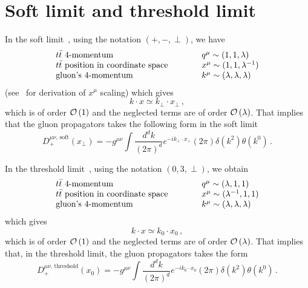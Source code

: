 \documentclass[a4paper,11pt]{report}
\numberwithin{equation}{section}
\begin{document}
\section{Soft limit and threshold limit}

In the soft limit~\cite{AntoniaMTh}, using the notation $(+,-,\perp)$, we have
%
\begin{equation}
  \begin{array}{lp{20pt}l}
  \text{\ttbar 4-momentum}                   & & q^\mu \sim (1,1,\lambda) \\
  \text{\ttbar position in coordinate space} & & 
      x^\mu \sim (1,1,\lambda^{-1}) \\
  \text{gluon's 4-momentum}                   & & 
      k^\mu \sim (\lambda,\lambda,\lambda) \\
  \end{array}
\end{equation}
%
(see~\cite{Becher:2010tm} for derivation of $x^\mu$ scaling) which gives
%
\begin{equation}
  k \cdot x \simeq k_\perp \cdot x_\perp\,,
\end{equation}
%
which is of order ${{\cal O}\left(1\right)}$ and the neglected terms are of order
${{\cal O}\left(\lambda\right)}$. That implies that the gluon propagators takes the following
form in the soft limit
%
\begin{equation}
  D^{\mu\nu,\, \text{soft}}_{+} (x_\perp) = 
  -g^{\mu\nu} \int \frac{d^d k}{(2\pi)^d}
  e^{-i k_\perp \cdot x_\perp} (2\pi) \delta(k^2) \theta(k^0)\,.
\end{equation}

In the threshold limit~\cite{Ahrens:2010zv}, using the notation $(0,3,\perp)$,
we obtain
%
\begin{equation}
  \begin{array}{lp{20pt}l}
  \text{\ttbar 4-momentum}                   & & q^\mu \sim (\lambda,1,1) \\
  \text{\ttbar position in coordinate space} & & 
      x^\mu \sim (\lambda^{-1},1,1) \\
  \text{gluon's 4-momentum}                   & & 
      k^\mu \sim (\lambda,\lambda,\lambda) \\
  \end{array}
\end{equation}
%
which gives
%
\begin{equation}
  k \cdot x \simeq k_0 \cdot x_0\,,
\end{equation}
%
which is of order ${{\cal O}\left(1\right)}$ and the neglected terms are of order
${{\cal O}\left(\lambda\right)}$. That implies that, in the threshold limit, the gluon
propagators takes the form~\cite{Ahrens:2010zv}
%
\begin{equation}
  D^{\mu\nu,\, \text{threshold}}_{+} (x_0) = 
  -g^{\mu\nu} \int \frac{d^d k}{(2\pi)^d}
  e^{-i k_0 \cdot x_0} (2\pi) \delta(k^2) \theta(k^0)\,.
\end{equation}
\end{document}
